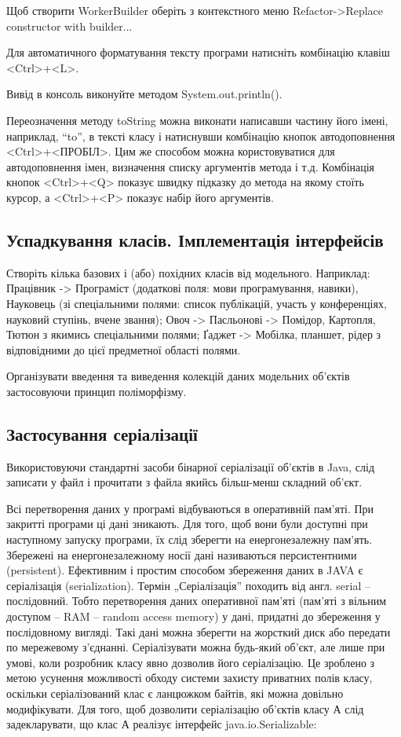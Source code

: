 Щоб створити WorkerBuilder оберіть з контекстного меню Refactor->Replace constructor with builder...


Для автоматичного форматування тексту програми  натисніть комбінацію клавіш <Ctrl>+<L>. 

Вивід в консоль виконуйте методом System.out.println().

Переозначення методу toString можна виконати написавши частину його імені, наприклад, ``to'', в тексті класу і натиснувши комбінацію кнопок автодоповнення <Ctrl>+<ПРОБІЛ>. Цим же способом можна користовуватися для автодоповнення імен, визначення списку аргументів метода і т.д. Комбінація кнопок <Ctrl>+<Q> показує швидку підказку до метода на якому стоїть курсор, а <Ctrl>+<P> показує набір його аргументів.

\subsection{Успадкування класів. Імплементація інтерфейсів}
Створіть кілька базових і (або) похідних класів від модельного. Наприклад: 
Працівник -> Програміст (додаткові поля: мови програмування, навики), Науковець (зі спеціальними полями: список публікацій, участь у конференціях, науковий ступінь, вчене звання); 
Овоч -> Пасльонові -> Помідор, Картопля, Тютюн з якимись спеціальними полями;
Ґаджет -> Мобілка, планшет, рідер з відповідними до цієї предметної області полями.

Організувати введення та виведення колекцій даних модельних об’єктів застосовуючи принцип поліморфізму.

\subsection{Застосування серіалізації}
Використовуючи стандартні засоби бінарної серіалізації об’єктів в Java, слід записати у файл і прочитати з файла якийсь більш-менш складний об’єкт.

Всі перетворення даних у програмі відбуваються в оперативній пам’яті. При закритті програми ці дані зникають. Для того, щоб вони були доступні при наступному запуску програми, їх слід зберегти на енергонезалежну пам’ять. Збережені на енергонезалежному носії дані називаються персистентними (persistent). 
Ефективним і простим способом збереження даних в JAVA є серіалізація (serialization). Термін „Серіалізація” походить від англ. serial – послідовний. Тобто перетворення даних оперативної пам’яті (пам’яті з вільним доступом – RAM – random access memory) у дані, придатні до збереження у послідовному вигляді. Такі дані можна зберегти на жорсткий диск або передати по мережевому з’єднанні.
Серіалізувати можна будь-який об’єкт, але лише при умові, коли розробник класу явно дозволив його серіалізацію. Це зроблено з метою усунення можливості обходу системи захисту приватних полів класу, оскільки серіалізований клас є ланцюжком байтів, які можна довільно модифікувати.
Для того, щоб дозволити серіалізацію об’єктів класу А слід задекларувати, що клас А реалізує інтерфейс java.io.Serializable:



